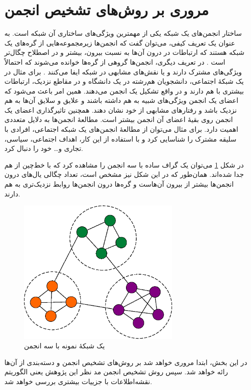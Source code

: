 \section{مروری بر روش‌های تشخیص انجمن}
ساختار انجمن‌های یک شبکه یکی از مهمترین ویژگی‌‌های ساختاری آن شبکه است. به عنوان یک تعریف کیفی، می‌توان گفت که انجمن‌ها زیرمجموعه‌هایی از گره‌های یک شبکه هستند که ارتباطات در درون آن‌ها به نسبت بیرون، بیشتر و در اصطلاح چگال‌تر است \cite{porter2009communities}. در تعریف دیگری، انجمن‌ها گروهی از گره‌ها خوانده می‌شوند که احتمالاً ویژگی‌های مشترک دارند و یا نقش‌های مشابهی در شبکه ایفا می‌کنند \cite{fortunato2010community}. برای مثال در یک شبکهٔ اجتماعی، دانشجویان هم‌رشته در یک دانشگاه و در مقاطع نزدیک، ارتباطات بیشتری با هم دارند و در واقع تشکیل یک انجمن می‌دهند. همین امر باعث می‌شود که اعضای یک انجمن ویژگی‌های شبیه به هم داشته باشند و علایق و سلایق آن‌ها به هم نزدیک باشد و رفتارهای مشابهی از خود نشان دهند. همچنین تاثیرگذاری اعضای یک انجمن روی بقیهٔ اعضای آن انجمن بیشتر است. مطالعهٔ انجمن‌ها به دلایل متعددی اهمیت دارد. برای مثال می‌توان از مطالعهٔ انجمن‌های یک شبکه اجتماعی، افرادی با سلیقه مشترک را شناسایی کرد و با استفاده از این کار، اهداف اجتماعی، سیاسی، تجاری و… خود را دنبال کرد.

در شکل \ref{fig:comm} می‌توان یک گراف ساده با سه انجمن را مشاهده کرد که با خط‌چین از هم جدا شده‌اند. همان‌طور که در این شکل نیز مشخص است، تعداد چگالی یال‌های درون انجمن‌ها بیشتر از بیرون آن‌هاست و گره‌ها درون انجمن‌ها روابط نزدیک‌تری به هم دارند.
\begin{figure}[!hbt]
  \begin{center}
    \includegraphics[width=8cm]{comm.eps}
    \caption{یک شبکهٔ نمونه با سه انجمن}
    \label{fig:comm}
  \end{center}
\end{figure}

در این بخش، ابتدا مروری خواهد شد بر روش‌های تشخیص انجمن و دسته‌بندی از آن‌ها رائه خواهد شد. سپس روش تشخیص انجمن مد نظر این پژوهش یعنی الگوریتم نقشه‌اطلاعات با جزییات بیشتری بررسی خواهد شد.

